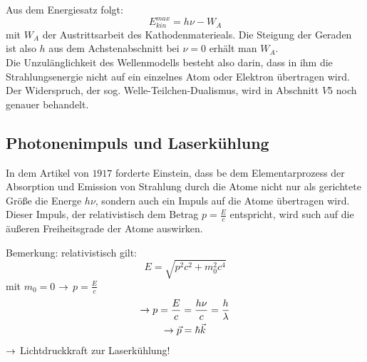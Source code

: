 Aus dem Energiesatz folgt:
\begin{equation*}
    E_{kin}^{max} = h\nu - W_A
\end{equation*}
mit $W_A$ der Austrittsarbeit des Kathodenmaterieals. Die Steigung der Geraden
ist also $h$ aus dem Achstenabschnitt bei $\nu = 0$ erhält man $W_A$.
\\
Die Unzulänglichkeit des Wellenmodells besteht also darin, dass in ihm die
Strahlungsenergie nicht auf ein einzelnes Atom oder Elektron übertragen wird.
Der Widerspruch, der sog. Welle-Teilchen-Dualismus, wird in Abschnitt $V 5$
noch genauer behandelt.
\subsection{Photonenimpuls und Laserkühlung} %
\label{sub:Photonenimpuls und Laserkühlung}
In dem Artikel von $1917$ forderte Einstein, dass be dem Elementarprozess der
Absorption und Emission von Strahlung durch die Atome nicht nur als gerichtete
Größe die Energe $h \nu$, sondern auch ein Impuls auf die Atome übertragen
wird. Dieser Impuls, der relativistisch dem Betrag $p = \frac{E}{c}$
entspricht, wird such auf die äußeren Freiheitsgrade der Atome auswirken.
\begin{erl}{Bemerkung:}
    relativistisch gilt: 
    \begin{equation*}
        E = \sqrt{p^2 c^2 + m_0^2 c^4}
    \end{equation*}
    mit $m_0=0$ $\rightarrow$ $p=\frac{E}{c}$
    \begin{gather*}
        \rightarrow p = \frac{E}{c}= \frac{h\nu}{c} = \frac{h}{\lambda} \\
        \rightarrow \vec{p} = \hbar \vec{k}
    \end{gather*}
    $\rightarrow$ Lichtdruckkraft zur Laserkühlung!
\end{erl}


